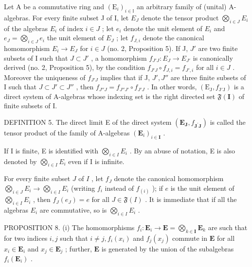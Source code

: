 Let A be a commutative ring and \((\mathrm{E}_{i})_{i\in\mathbb{I}}\) an arbitrary family of (unital) A-algebras. For every finite subset J of I, let \(E_{J}\) denote the tensor product \(\bigotimes_{i\in J}E_{i}\) of the algebras \(E_{i}\) of index \(i\in J\) ; let \(e_{i}\) denote the unit element of \(E_{i}\) and \(e_{J}=\bigotimes_{i\in J}e_{i}\) the unit element of \(E_{J}\) ; let \(f_{J,i}\) denote the canonical homomorphism \(E_{i}\to E_{J}\) for \(i\in J\) (no. 2, Proposition 5). If J, \(J'\) are two finite subsets of I such that \(J\subset J'\) , a homomorphism \(f_{J'J}:E_{J}\to E_{J'}\) is canonically derived (no. 2, Proposition 5), by the condition \(f_{J'J}\circ f_{J,i}=f_{J',i}\) for all \(i\in J\) . Moreover the uniqueness of \(f_{J'J}\) implies that if J, \(J',J''\) are three finite subsets of I such that \(J\subset J'\subset J''\) , then \(f_{J''J}=f_{J''J'}\circ f_{J'J}\) . In other words, \((\mathrm{E}_{\mathrm{J}},f_{\mathrm{J}'\mathrm{J}})\) is a direct system of A-algebras whose indexing set is the right directed set \(\mathfrak{F}(\mathbf{I})\) of finite subsets of I.

DEFINITION 5. The direct limit E of the direct system \((\mathbf{E}_{\mathbf{J}}, f_{\mathbf{J}^{\prime}\mathbf{J}})\) is called the tensor product of the family of A-algebras \((\mathbf{E}_i)_{i \in \mathbf{I}}\) .

If I is finite, E is identified with \(\bigotimes_{i\in I}E_i\) . By an abuse of notation, E is also denoted by \(\bigotimes_{i\in I}E_i\) even if I is infinite.

For every finite subset \(J\) of \(I\) , let \(f_{J}\) denote the canonical homomorphism \(\bigotimes_{i \in J} E_{i} \to \bigotimes_{i \in I} E_{i}\) (writing \(f_{i}\) instead of \(f_{(i)}\) ); if \(e\) is the unit element of \(\bigotimes_{i \in I} E_{i}\) , then \(f_{J}(e_{J}) = e\) for all \(J \in \mathfrak{F}(I)\) . It is immediate that if all the algebras \(E_{i}\) are commutative, so is \(\bigotimes_{i \in I} E_{i}\) .

PROPOSITION 8. (i) The homomorphisms \(f_{i} \colon \mathbf{E}_{i} \to \mathbf{E} = \bigotimes_{k \in \mathbf{I}} \mathbf{E}_{k}\) are such that for two indices \(i, j\) such that \(i \neq j, f_{i}(x_{i})\) and \(f_{j}(x_{j})\) commute in \(\mathbf{E}\) for all \(x_{i} \in \mathbf{E}_{i}\) and \(x_{j} \in \mathbf{E}_{j}\) ; further, \(\mathbf{E}\) is generated by the union of the subalgebras \(f_{i}(\mathbf{E}_{i})\) .

